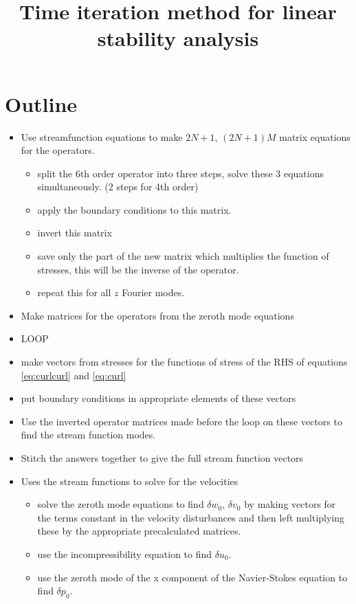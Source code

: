\documentclass[12pt,a4paper]{article}
\newcommand{\su}{\delta u}
\newcommand{\sv}{\delta v}
\newcommand{\sw}{\delta w}
\newcommand{\spr}{\delta p}
\begin{document}
\title{Time iteration method for linear stability analysis}
\maketitle

\section{Outline}
\begin{itemize}
    \item Use streamfunction equations to make $2N+1$, $(2N+1)M$ matrix equations for the operators.
    \begin{itemize}
	\item split the 6th order operator into three steps, solve these 3 equations simultaneously. (2 steps for 4th order)
	\item apply the boundary conditions to this matrix.
	\item invert this matrix
	\item save only the part of the new matrix which multiplies the function of stresses, this will be the inverse of the operator.
	\item repeat this for all $z$ Fourier modes.
    \end{itemize}
    \item Make matrices for the operators from the zeroth mode equations
    \item LOOP
    \item make vectors from stresses for the functions of stress of the RHS of equations \ref{eq:curlcurl} and \ref{eq:curl}
    \item put boundary conditions in appropriate elements of these vectors
    \item Use the inverted operator matrices made before the loop on these vectors to find the stream function modes. 
    \item Stitch the answers together to give the full stream function vectors
    \item Uses the stream functions to solve for the velocities
	\begin{itemize}
	    \item solve the zeroth mode equations to find $\sw_{0}$, $\sv_{0}$ by making vectors for the terms constant in the velocity disturbances and then left multiplying these by the appropriate precalculated matrices.
	    \item use the incompressibility equation to find $\su_{0}$.
	    \item use the zeroth mode of the x component of the Navier-Stokes equation to find $\spr_{0}$.

\end{itemize}
\end{itemize}
\end{document}

